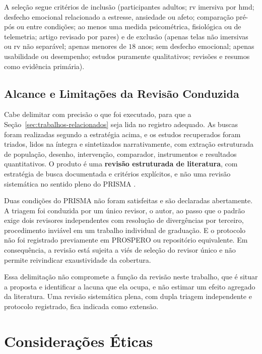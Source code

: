 A seleção segue critérios de inclusão (participantes adultos; \gls{rv} imersiva por \gls{hmd}; desfecho emocional relacionado a estresse, ansiedade ou afeto; comparação pré-pós ou entre condições; ao menos uma medida psicométrica, fisiológica ou de telemetria; artigo revisado por pares) e de exclusão (apenas telas não imersivas ou \gls{rv} não separável; apenas menores de $18$ anos; sem desfecho emocional; apenas usabilidade ou desempenho; estudos puramente qualitativos; revisões e resumos como evidência primária).

\subsection{Alcance e Limitações da Revisão Conduzida}\label{subsec:alcance-revisao}

Cabe delimitar com precisão o que foi executado, para que a Seção~\ref{sec:trabalhos-relacionados} seja lida no registro adequado. As buscas foram realizadas segundo a estratégia acima, e os estudos recuperados foram triados, lidos na íntegra e sintetizados narrativamente, com extração estruturada de população, desenho, intervenção, comparador, instrumentos e resultados quantitativos. O produto é uma \textbf{revisão estruturada de literatura}, com estratégia de busca documentada e critérios explícitos, e não uma revisão sistemática no sentido pleno do PRISMA \citep{Page2021}.

Duas condições do PRISMA não foram satisfeitas e são declaradas abertamente. A triagem foi conduzida por um único revisor, o autor, ao passo que o padrão exige dois revisores independentes com resolução de divergências por terceiro, procedimento inviável em um trabalho individual de graduação. E o protocolo não foi registrado previamente em PROSPERO ou repositório equivalente. Em consequência, a revisão está sujeita a viés de seleção do revisor único e não permite reivindicar exaustividade da cobertura.

Essa delimitação não compromete a função da revisão neste trabalho, que é situar a proposta e identificar a lacuna que ela ocupa, e não estimar um efeito agregado da literatura. Uma revisão sistemática plena, com dupla triagem independente e protocolo registrado, fica indicada como extensão.

\section{Considerações Éticas}\label{sec:etica}

